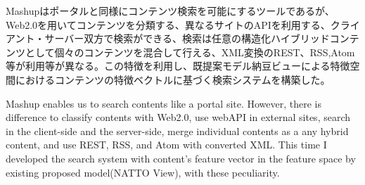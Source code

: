 
\begin{jabstract}
Mashupはポータルと同様にコンテンツ検索を可能にするツールであるが、Web2.0を用いてコンテンツを分類する、異なるサイトのAPIを利用する、クライアント・サーバー双方で検索ができる、検索は任意の構造化ハイブリッドコンテンツとして個々のコンテンツを混合して行える、XML変換のREST、RSS,Atom等が利用等が異なる。この特徴を利用し、既提案モデル納豆ビューによる特徴空間におけるコンテンツの特徴ベクトルに基づく検索システムを構築した。
\end{jabstract}

\begin{eabstract}
Mashup enables us to search contents like a portal site. However, there is difference to classify contents with Web2.0, use webAPI in external sites, search in the client-side and  the server-side, merge individual contents as a any hybrid content, and use REST, RSS, and Atom with converted XML. This time I developed the search system with content's feature vector in the feature space by existing proposed model(NATTO View), with these peculiarity.
\end{eabstract}